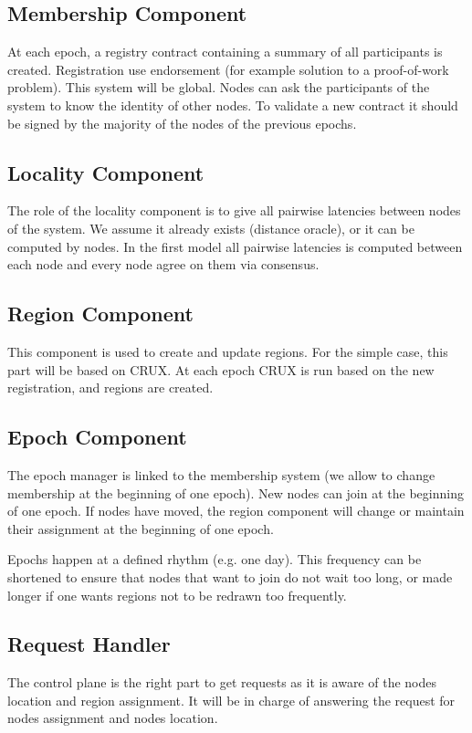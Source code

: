 \documentclass[a4paper,11pt,oneside]{report}
\begin{document}
\subsection{Membership Component}

At each epoch, a registry contract containing a summary of all participants is
created. Registration use endorsement (for example solution to a proof-of-work
problem).  This system will be global. Nodes can ask the participants of the
system to know the identity of other nodes. To validate a new contract  it
should be signed by the majority of the nodes of the previous epochs.

\subsection{Locality Component}

 The role of the locality component is to give all pairwise latencies between
 nodes of the system. We assume it already exists (distance oracle), or it can
 be computed by nodes. In the first model all pairwise latencies is computed
 between each node and every node agree on them via consensus. 
 
 \subsection{Region Component} This component is used to create and update
 regions. For the simple case, this part will be based on CRUX. At each epoch
 CRUX is run based on the new registration, and regions are created.
 
 \subsection{Epoch Component} The epoch manager is linked to the membership
 system (we allow to change membership at the beginning of one epoch). New
 nodes can join at the beginning of one epoch. If nodes have moved, the region
 component will change or maintain their assignment at the beginning of one
 epoch. 

Epochs happen at a defined rhythm (e.g. one day). This frequency can be
shortened to ensure that nodes that want to join do not wait too long, or made
longer if one wants regions not to be redrawn too frequently. 

\subsection{Request Handler} The control plane is the right part to get
requests as it is aware of the nodes location and region assignment. It will be
in charge of answering the request for nodes assignment and nodes location. 
\end{document}
